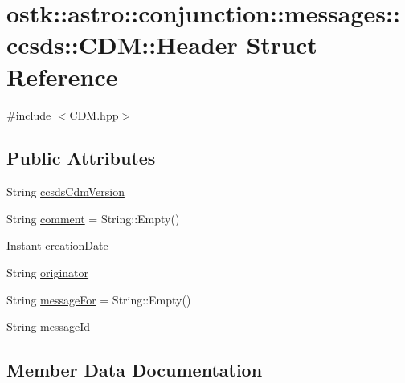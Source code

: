 \hypertarget{structostk_1_1astro_1_1conjunction_1_1messages_1_1ccsds_1_1_c_d_m_1_1_header}{}\section{ostk\+:\+:astro\+:\+:conjunction\+:\+:messages\+:\+:ccsds\+:\+:C\+DM\+:\+:Header Struct Reference}
\label{structostk_1_1astro_1_1conjunction_1_1messages_1_1ccsds_1_1_c_d_m_1_1_header}


{\ttfamily \#include $<$C\+D\+M.\+hpp$>$}

\subsection*{Public Attributes}
\begin{DoxyCompactItemize}
\item 
String \hyperlink{structostk_1_1astro_1_1conjunction_1_1messages_1_1ccsds_1_1_c_d_m_1_1_header_a3050d7ef808f9ee8f10fd3346ffcb23f}{ccsds\+Cdm\+Version}
\item 
String \hyperlink{structostk_1_1astro_1_1conjunction_1_1messages_1_1ccsds_1_1_c_d_m_1_1_header_a5f903615e1e7bb48a7335ef4337a6218}{comment} = String\+::\+Empty()
\item 
Instant \hyperlink{structostk_1_1astro_1_1conjunction_1_1messages_1_1ccsds_1_1_c_d_m_1_1_header_a2188a4fc3aca51a6d96f3eedc5205d72}{creation\+Date}
\item 
String \hyperlink{structostk_1_1astro_1_1conjunction_1_1messages_1_1ccsds_1_1_c_d_m_1_1_header_aaff1cbfa0ac968d01e6f5d03a70a30ce}{originator}
\item 
String \hyperlink{structostk_1_1astro_1_1conjunction_1_1messages_1_1ccsds_1_1_c_d_m_1_1_header_aa82722c53756f396de0dafeeda1fc327}{message\+For} = String\+::\+Empty()
\item 
String \hyperlink{structostk_1_1astro_1_1conjunction_1_1messages_1_1ccsds_1_1_c_d_m_1_1_header_a9f8a18247622e0fa0b4394bfa51b501c}{message\+Id}
\end{DoxyCompactItemize}


\subsection{Member Data Documentation}
\mbox{\label{structostk_1_1astro_1_1conjunction_1_1messages_1_1ccsds_1_1_c_d_m_1_1_header_a3050d7ef808f9ee8f10fd3346ffcb23f}} 
